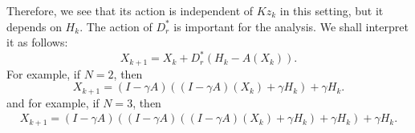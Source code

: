 \begin{itemize}
Therefore, we see that its action is independent of $Kz_k$ in this setting, but it depends on $H_k$. The action of $D_r^*$ is important for the analysis. We shall interpret it as follows: 
\begin{equation} 
X_{k+1} = X_k + D_r^*(H_k - A(X_k)).  
\end{equation} 
For example, if $N = 2$, then 
\begin{equation} 
X_{k+1} = (I - \gamma A)((I - \gamma A)(X_k) + \gamma H_k) + \gamma H_k. 
\end{equation}
and for example, if $N = 3$, then 
\begin{eqnarray*} 
X_{k+1} = (I - \gamma A)((I - \gamma A)((I - \gamma A)(X_k) + \gamma H_k) + \gamma H_k) + \gamma H_k.  
\end{eqnarray*}



\end{itemize}
